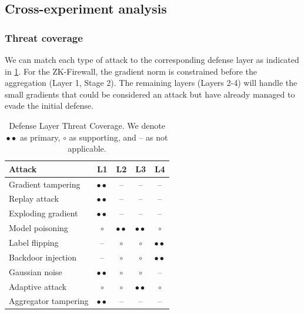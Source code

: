 \documentclass[10pt,twocolumn,letterpaper]{article}
\begin{document}
%                     
\subsection{Cross-experiment analysis}
\label{sec:analysis}
%                     

\subsubsection{Threat coverage}


We can match each type of attack to the corresponding defense layer as indicated in \cref{tab:threats}. For the ZK-Firewall, the gradient norm is constrained before the aggregation (Layer 1, Stage 2). The remaining layers (Layers 2-4) will handle the small gradients that could be considered an attack but have already managed to evade the initial defense.

\begin{table}[t]
  \centering
  \small 
  \caption{Defense Layer Threat Coverage. We denote $\bullet\bullet$ as primary, $\circ$ as supporting, and -- as not applicable.}
  \label{tab:threats}
  \begin{tabular}{@{}lcccc@{}}
    \toprule
    \textbf{Attack} & \textbf{L1} & \textbf{L2} & \textbf{L3} & \textbf{L4} \\
    \midrule
    Gradient tampering   & $\bullet\bullet$ & --               & --               & --               \\
    Replay attack        & $\bullet\bullet$ & --               & --               & --               \\
    Exploding gradient   & $\bullet\bullet$ & --               & --               & --               \\
    Model poisoning      & $\circ$          & $\bullet\bullet$ & $\bullet\bullet$ & $\circ$          \\
    Label flipping       & --               & $\circ$          & $\circ$          & $\bullet\bullet$ \\
    Backdoor injection   & --               & $\circ$          & $\circ$          & $\bullet\bullet$ \\
    Gaussian noise       & $\bullet\bullet$ & $\circ$          & $\circ$          & --               \\
    Adaptive attack      & $\circ$          & $\circ$          & $\bullet\bullet$ & $\circ$          \\
    Aggregator tampering & $\bullet\bullet$ & --               & --               & --               \\
    \bottomrule
  \end{tabular}
\end{table}
\end{document}

